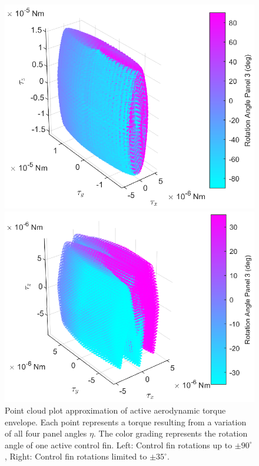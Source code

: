 \documentclass[pdflatex,sn-mathphys-num]{sn-jnl}%
\theoremstyle{thmstyleone}%
\theoremstyle{thmstyletwo}%
\theoremstyle{thmstylethree}%
\begin{document}
		\begin{figure}[htbp]
			\centering
			\begin{minipage}{0.48\textwidth}
				\centering
				\includegraphics[width=\linewidth]{Figures/fig4.eps}
			\end{minipage}%
			\hfill
			\begin{minipage}{0.48\textwidth}
				\centering
				\includegraphics[width=\linewidth]{Figures/fig5.eps}
			\end{minipage}
			\caption{Point cloud plot approximation of active aerodynamic torque envelope. Each point represents a torque resulting from a variation of all four panel angles $\eta$. The color grading represents the rotation angle of one active control fin. Left: Control fin rotations up to $\pm 90^{\circ}$, Right: Control fin rotations limited to $\pm 35^{\circ}$.}
			\label{fig:torque_envelope}
		\end{figure}
\end{document}
